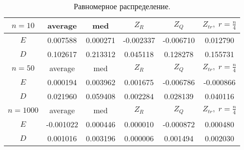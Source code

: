 \documentclass[a4]{article}
\begin{document}
		\begin{table}[h]
			\caption{ Равномерное распределение.}
			\begin{center}
				\begin{tabular}{|c|c|c|c|c|c|}
					\hline
					$n = 10$  & average & med & $Z_R$ & $Z_Q$ & $Z_{tr},\;r=\frac{n}{4}$\\ \hline
					$E$      & 0.007588         & 0.000271         & -0.002337        & -0.006710        & 0.012790         \\ \hline
					$D$      & 0.102617         & 0.213312         & 0.045118         & 0.128278         & 0.155731         \\ \hline
					\hline
					$n = 50$ & average & med & $Z_R$ & $Z_Q$ & $Z_{tr},\;r=\frac{n}{4}$\\ \hline
					$E$      & 0.000194         & 0.003962         & 0.001675         & -0.006786        & -0.000866        \\ \hline
					$D$      & 0.021960         & 0.059408         & 0.002284         & 0.028139         & 0.040116         \\ \hline
					\hline
					$n =1000$ & average & med & $Z_R$ & $Z_Q$ & $Z_{tr},\;r=\frac{n}{4}$\\ \hline
					$E$      & -0.001022        & 0.000446         & 0.000010         & -0.000872        & 0.000480         \\ \hline
					$D$      & 0.001016         & 0.003196         & 0.000006         & 0.001494         & 0.002030         \\ \hline
				\end{tabular}
			\end{center}
		\end{table}
		
\end{document}
